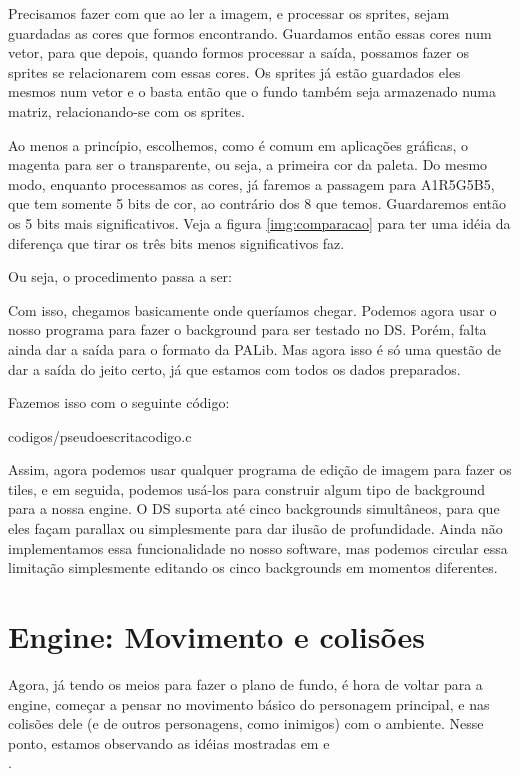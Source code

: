 \documentclass[brazil]{abnt}
\begin{document}
Precisamos fazer com que ao ler a imagem, e processar os sprites, sejam guardadas as cores que formos encontrando. Guardamos então essas cores num vetor, para que depois, quando formos processar a saída, possamos fazer os sprites se relacionarem com essas cores. Os sprites já estão guardados eles mesmos num vetor e o basta então que o fundo também seja armazenado numa matriz, relacionando-se com os sprites.

Ao menos a princípio, escolhemos, como é comum em aplicações gráficas, o magenta para ser o transparente, ou seja, a primeira cor da paleta. Do mesmo modo, enquanto processamos as cores, já faremos a passagem para A1R5G5B5, que tem somente 5 bits de cor, ao contrário dos 8 que temos. Guardaremos então os 5 bits mais significativos. Veja a figura \ref{img:comparacao} para ter uma idéia da diferença que tirar os três bits menos significativos faz.

Ou seja, o procedimento passa a ser:



Com isso, chegamos basicamente onde queríamos chegar. Podemos agora usar o nosso programa para fazer o background para ser testado no DS. Porém, falta ainda dar a saída para o formato da PALib. Mas agora isso é só uma questão de dar a saída do jeito certo, já que estamos com todos os dados preparados.

Fazemos isso com o seguinte código:


{codigos/pseudoescritacodigo.c}

Assim, agora podemos usar qualquer programa de edição de imagem para fazer os tiles, e em seguida, podemos usá-los para construir algum tipo de background para a nossa engine. O DS suporta até cinco backgrounds simultâneos, para que eles façam parallax ou simplesmente para dar ilusão de profundidade. Ainda não implementamos essa funcionalidade no nosso software, mas podemos circular essa limitação simplesmente editando os cinco backgrounds em momentos diferentes.

\section{Engine: Movimento e colisões}

Agora, já tendo os meios para fazer o plano de fundo, é hora de voltar para a engine, começar a pensar no movimento básico do personagem principal, e nas colisões dele (e de outros personagens, como inimigos) com o ambiente. Nesse ponto, estamos observando as idéias mostradas em \cite[N Tutorial A]{NCollisionA} e \\\cite[N Tutorial B]{NCollisionB}.
\end{document}
